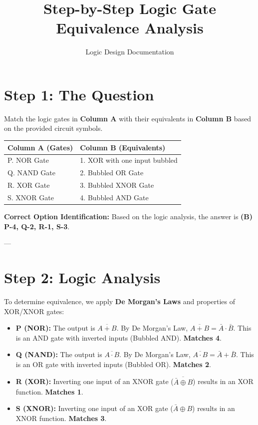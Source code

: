 \documentclass[11pt]{article}
\begin{document}
\title{Step-by-Step Logic Gate Equivalence Analysis}
\author{Logic Design Documentation}
\date{}
\maketitle

\section{Step 1: The Question}
Match the logic gates in \textbf{Column A} with their equivalents in \textbf{Column B} based on the provided circuit symbols.

\begin{center}
\begin{tabular}{ll}
\toprule
\textbf{Column A (Gates)} & \textbf{Column B (Equivalents)} \\
\midrule
P. NOR Gate & 1. XOR with one input bubbled \\
Q. NAND Gate & 2. Bubbled OR Gate \\
R. XOR Gate & 3. Bubbled XNOR Gate \\
S. XNOR Gate & 4. Bubbled AND Gate \\
\bottomrule
\end{tabular}
\end{center}

\textbf{Correct Option Identification:} Based on the logic analysis, the answer is \textbf{(B) P-4, Q-2, R-1, S-3}.

---

\section{Step 2: Logic Analysis}
To determine equivalence, we apply \textbf{De Morgan's Laws} and properties of XOR/XNOR gates:

\begin{itemize}
    \item \textbf{P (NOR):} The output is $\overline{A + B}$. By De Morgan's Law, $\overline{A + B} = \bar{A} \cdot \bar{B}$. This is an AND gate with inverted inputs (Bubbled AND). \textbf{Matches 4}.
    \item \textbf{Q (NAND):} The output is $\overline{A \cdot B}$. By De Morgan's Law, $\overline{A \cdot B} = \bar{A} + \bar{B}$. This is an OR gate with inverted inputs (Bubbled OR). \textbf{Matches 2}.
    \item \textbf{R (XOR):} Inverting one input of an XNOR gate ($\overline{\bar{A} \oplus B}$) results in an XOR function. \textbf{Matches 1}.
    \item \textbf{S (XNOR):} Inverting one input of an XOR gate ($\bar{A} \oplus B$) results in an XNOR function. \textbf{Matches 3}.
\end{itemize}
\end{document}
